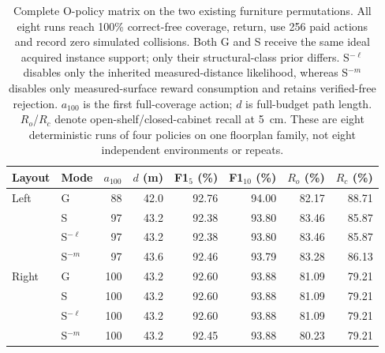 \begin{table}[!htbp]
\centering\small\setlength{\tabcolsep}{4.0pt}
\caption{Complete O-policy matrix on the two existing furniture permutations. All eight runs reach 100\% correct-free coverage, return, use 256 paid actions and record zero simulated collisions. Both G and S receive the same ideal acquired instance support; only their structural-class prior differs. S$^{-\ell}$ disables only the inherited measured-distance likelihood, whereas S$^{-m}$ disables only measured-surface reward consumption and retains verified-free rejection. $a_{100}$ is the first full-coverage action; $d$ is full-budget path length. $R_o$/$R_c$ denote open-shelf/closed-cabinet recall at 5~cm. These are eight deterministic runs of four policies on one floorplan family, not eight independent environments or repeats.}
\label{tab:observed-object-policy}
\begin{tabular}{llrrrrrr}
\toprule
Layout & Mode & $a_{100}$ & $d$ (m) & F1$_5$ (\%) & F1$_{10}$ (\%) & $R_o$ (\%) & $R_c$ (\%) \\
\midrule
Left & G & 88 & 42.0 & 92.76 & 94.00 & 82.17 & 88.71 \\
 & S & 97 & 43.2 & 92.38 & 93.80 & 83.46 & 85.87 \\
 & S$^{-\ell}$ & 97 & 43.2 & 92.38 & 93.80 & 83.46 & 85.87 \\
 & S$^{-m}$ & 97 & 43.6 & 92.46 & 93.79 & 83.28 & 86.13 \\
\midrule
Right & G & 100 & 43.2 & 92.60 & 93.88 & 81.09 & 79.21 \\
 & S & 100 & 43.2 & 92.60 & 93.88 & 81.09 & 79.21 \\
 & S$^{-\ell}$ & 100 & 43.2 & 92.60 & 93.88 & 81.09 & 79.21 \\
 & S$^{-m}$ & 100 & 43.2 & 92.45 & 93.88 & 80.23 & 79.21 \\
\bottomrule
\end{tabular}
\end{table}
